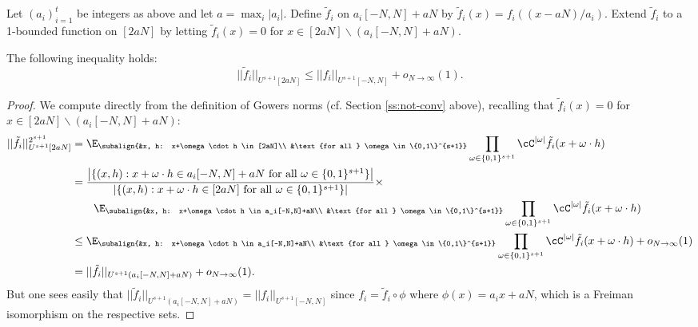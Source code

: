 Let $(a_i)_{i=1}^t$ be integers as above and let $a = \max_i |a_i|$. Define $\tilde f_i$ on $a_i[-N,N]+aN$ by $\tilde  f_i(x) = f_i((x-aN)/a_i)$. Extend $\tilde f_i$ to a 1-bounded function on $[2aN]$ by letting $\tilde f_i(x) = 0$ for $x \in [2aN]\backslash (a_i[-N,N]+aN)$. 

\begin{lemma}\label{l:gowNorms}
The following inequality holds:
\[ ||\tilde f_i||_{U^{s+1}[2aN]} \leq || f_i||_{U^{s+1}[-N,N]} + o_{N\to \infty}(1).\]
\end{lemma}
\begin{proof}
We compute directly from the definition of Gowers norms (cf. Section \ref{ss:not-conv} above), recalling that $\tilde f_i(x) = 0$ for $x \in [2aN]\backslash (a_i[-N,N]+aN)$: 
\begin{align*}
||\tilde f_i||_{U^{s+1}[2aN]}^{2^{s+1}} &= \E_{\subalign{&x, h: x+\omega \cdot h \in [2aN]\\ &\text{for all } \omega \in \{0,1\}^{s+1}}} \prod_{\omega\in\{0,1\}^{s+1}} \cC^{|\omega|} \tilde f_i(x + \omega \cdot h) \\
&=  \frac{\left|\{(x,h):x + \omega \cdot h \in a_i[-N,N]+aN \text{ for all } \omega \in \{0,1\}^{s+1} \}\right|}{\left|\{(x,h):x + \omega \cdot h \in [2aN] \text{ for all } \omega \in \{0,1\}^{s+1}\}\right|} \times \\
& \qquad \E_{\subalign{&x, h: x+\omega \cdot h \in a_i[-N,N]+aN\\ &\text{for all } \omega \in \{0,1\}^{s+1}}}\prod_{\omega\in\{0,1\}^{s+1}} \cC^{|\omega|} \tilde f_i(x + \omega \cdot h) \\
& \leq  \E_{\subalign{&x, h: x+\omega \cdot h \in a_i[-N,N]+aN\\ &\text{for all } \omega \in \{0,1\}^{s+1}}}\prod_{\omega\in\{0,1\}^{s+1}} \cC^{|\omega|} \tilde f_i(x + \omega \cdot h)  + o_{N\to \infty}(1)\\
&= ||\tilde f_i||_{U^{s+1}(a_i[-N,N]+aN)}  + o_{N\to \infty}(1). 
\end{align*}
But one sees easily that $||\tilde  f_i||_{U^{s+1}(a_i[-N,N]+aN)} = || f_i||_{U^{s+1}[-N,N]}$ since $f_i = \tilde f_i \circ \phi$ where $\phi(x) = a_ix+aN$, which is a Freiman isomorphism on the respective sets.
\end{proof}

	

